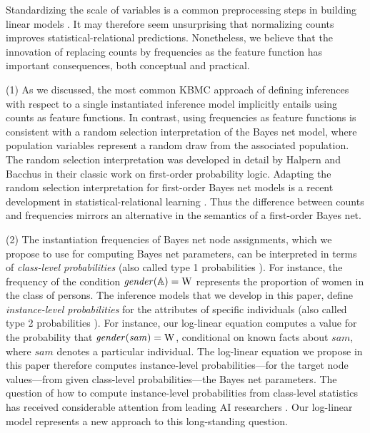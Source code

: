 \documentclass[twoside,11pt]{article}
\begin{document}
Standardizing the scale of variables is a common preprocessing steps in building linear models \cite{Bishop2006}. It may therefore seem unsurprising that normalizing counts improves statistical-relational predictions. Nonetheless, we believe that the innovation of replacing counts by frequencies as the feature function has important consequences, both conceptual and practical.  

(1) As we discussed, the most common KBMC approach of defining inferences with respect to a single instantiated inference model implicitly entails using counts as feature functions. In contrast, using frequencies as feature functions is  consistent with a random selection interpretation of the Bayes net model, where population variables represent a random draw from the associated population. The random selection interpretation was developed in detail by Halpern \cite{Halpern90} and Bacchus \cite{Bacchus90} in their classic work on first-order probability logic. Adapting the random selection interpretation for first-order Bayes net models is a recent development in statistical-relational learning \cite{Schulte2013}. Thus the difference between counts and frequencies mirrors an alternative in the semantics of a first-order Bayes net. 

(2) The instantiation frequencies of Bayes net node assignments, which we propose to use for computing Bayes net parameters, can be interpreted in terms of {\em class-level probabilities} \cite{Schulte2013} (also called type 1 probabilities \cite{Halpern90}). For instance, the frequency of the condition $\it{gender}(\mathbb{A}) = \mathrm{W}$ represents the proportion of women in the class of persons. The inference models that we develop in this paper, define {\em instance-level probabilities} for the attributes of specific individuals (also called type 2 probabilities \cite{Halpern90}). For instance, our log-linear equation computes a value for the probability that $\it{gender}(sam) = \mathrm{W}$, conditional on known facts about $sam$, where $sam$ denotes a particular individual. The log-linear equation we propose in this paper therefore computes instance-level probabilities---for the target node values---from given class-level probabilities---the Bayes net parameters. The question of how to compute instance-level probabilities from class-level statistics has received considerable attention from leading AI researchers \cite{Bacchus1992,Halpern2006}. Our log-linear model represents a new approach to this long-standing question.
\end{document}
